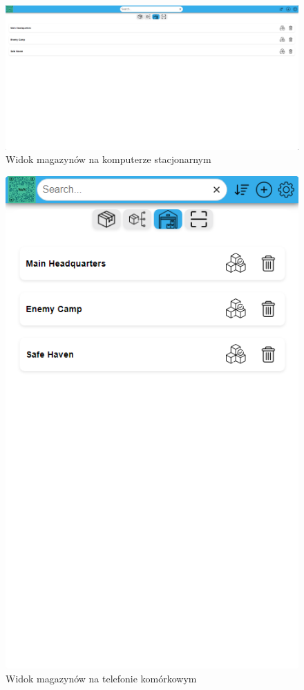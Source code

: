\documentclass[../main.tex]{subfiles}
\begin{document}
            \begin{figure}[H]
                \centering
                \includegraphics[width=\getImageWidth]{images/app-desktop/app-warehouses-desktop.png}
                \caption{Widok magazynów na komputerze stacjonarnym}
                \label{fig:app-warehouses-desktop}
            \end{figure}
                
            \begin{figure}[H]
                \centering
                \includegraphics[height=\getImageHeight]{images/app-mobile/app-warehouses-mobile.png}
                \caption{Widok magazynów na telefonie komórkowym}
                \label{fig:app-warehouses-mobile}
            \end{figure}
\end{document}
